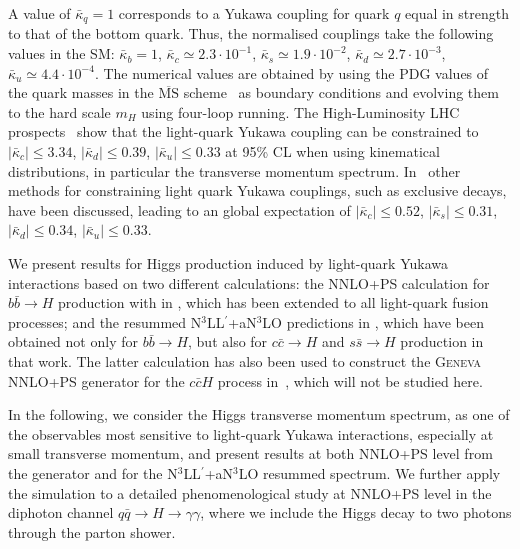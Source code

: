 \documentclass[11pt,a4paper]{article}
\begin{document}
A value of $ \bar\kappa_q = 1 $ corresponds to a Yukawa coupling for quark $ q $ equal in strength to that of the bottom quark. Thus, the normalised couplings take the following values in the SM:  
$ \bar \kappa_b = 1 $, $ \bar \kappa_c \simeq 2.3 \cdot 10^{-1} $, $ \bar \kappa_s \simeq 1.9 \cdot 10^{-2} $, $ \bar \kappa_d \simeq 2.7 \cdot 10^{-3} $, $ \bar \kappa_u \simeq 4.4 \cdot 10^{-4} $.
The numerical values are obtained by using the PDG values of the quark masses in the $\overline{\text{MS}}$ scheme~\cite{ParticleDataGroup:2024cfk} as boundary conditions and evolving them to the hard scale $m_H$ using four-loop running. The High-Luminosity LHC prospects~\cite{Cepeda:2019klc} show that the light-quark Yukawa coupling can be constrained to $|\bar \kappa_c|\leq 3.34$, $|\bar \kappa_d|\leq 0.39$, $|\bar \kappa_u|\leq 0.33$ at 95\% CL when using kinematical distributions, in particular the transverse momentum spectrum. In~ other methods for constraining light quark Yukawa couplings, such as exclusive decays, have been discussed, leading to an global expectation of $|\bar \kappa_c|\leq 0.52$, $|\bar \kappa_s|\leq 0.31$, $|\bar \kappa_d|\leq 0.34$, $|\bar \kappa_u|\leq 0.33$.

We present results for Higgs production induced by light-quark Yukawa interactions
based on two different calculations:
the NNLO+PS calculation for $b\bar b \to H$ production with \minnlo{} 
in , which has been extended to all light-quark fusion processes;
and the resummed 
N$^3$LL$^{\prime}$+aN$^3$LO predictions in ,
which have been obtained not only for $b\bar{b}\to H$, but also 
for $c\bar{c}\to H$ and $s\bar{s}\to H$ production in that work.
The latter calculation has also been used to construct the 
\textsc{Geneva} NNLO+PS generator for the $c\bar{c}H$ process in~, which will not be studied here.

In the following, we consider the Higgs transverse momentum spectrum, as one of the 
observables most sensitive to light-quark Yukawa interactions, especially at small 
transverse momentum, and present results at both NNLO+PS level from the 
\minnlo{} generator and for the N$^3$LL$^{\prime}$+aN$^3$LO resummed spectrum.
We further apply the \minnlo{}  simulation to a detailed phenomenological study at 
NNLO+PS level in the diphoton channel $q\bar q\rightarrow H\rightarrow \gamma\gamma$, where we include the Higgs decay to two photons through
the  parton shower.
\end{document}
